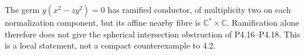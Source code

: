 
\begin{proposition}[P4.19]\hypertarget{tag-02WQ}{}\label{night:P4.19}\label{stmt:P4.19}


The germ $y(x^2-zy^2)=0$ has ramified conductor, of multiplicity
two on each normalization component, but its affine nearby
fibre is $\mathbb C^*\times\mathbb C$. Ramification alone
therefore does not give the spherical intersection obstruction
of P4.16--P4.18. This is a local statement, not a compact
counterexample to 4.2.
\end{proposition}

